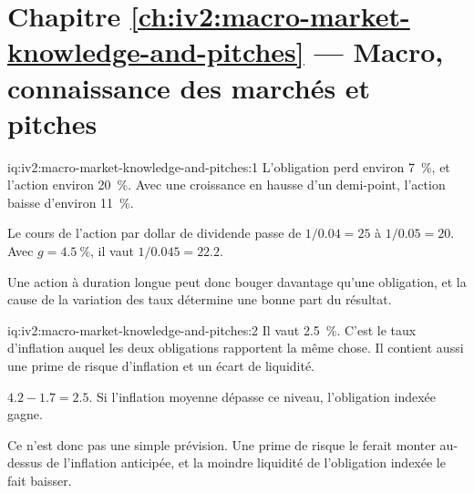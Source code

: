 \section*{Chapitre \ref{ch:iv2:macro-market-knowledge-and-pitches} --- Macro, connaissance des marchés et pitches}

\begin{solution}{iq:iv2:macro-market-knowledge-and-pitches:1}
L'obligation perd environ 7~\%, et l'action environ 20~\%. Avec une croissance en hausse d'un demi-point, l'action baisse d'environ 11~\%.

Le cours de l'action par dollar de dividende passe de $1/0.04 = 25$ à $1/0.05 = 20$. Avec $g = 4.5~\%$, il vaut $1/0.045 = 22.2$.

Une action à duration longue peut donc bouger davantage qu'une obligation, et la cause de la variation des taux détermine une bonne part du résultat.

\end{solution}

\begin{solution}{iq:iv2:macro-market-knowledge-and-pitches:2}
Il vaut 2.5~\%. C'est le taux d'inflation auquel les deux obligations rapportent la même chose. Il contient aussi une prime de risque d'inflation et un écart de liquidité.

$4.2 - 1.7 = 2.5$. Si l'inflation moyenne dépasse ce niveau, l'obligation indexée gagne.

Ce n'est donc pas une simple prévision. Une prime de risque le ferait monter au-dessus de l'inflation anticipée, et la moindre liquidité de l'obligation indexée le fait baisser.

\end{solution}

